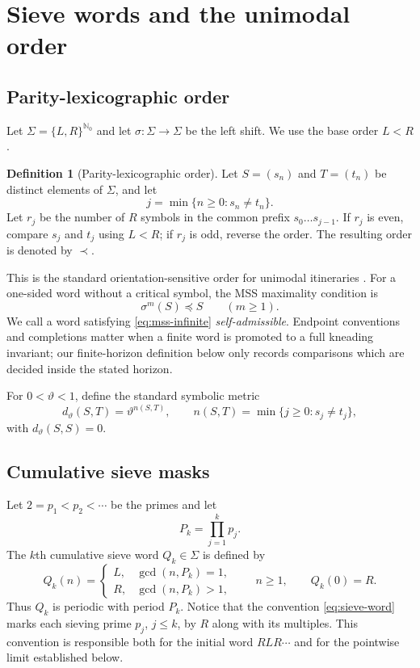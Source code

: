 \documentclass[11pt]{article}
\theoremstyle{definition}
\newtheorem{definition}[theorem]{Definition}
\theoremstyle{remark}
\newcommand{\N}{\mathbb{N}}
\newcommand{\Sig}{\Sigma}
\newcommand{\sh}{\sigma}
\begin{document}
\section{Sieve words and the unimodal order}

\subsection{Parity-lexicographic order}

Let $\Sig=\{L,R\}^{\N_0}$ and let $\sh:\Sig\to\Sig$ be the left shift.  We use the base order $L<R$.

\begin{definition}[Parity-lexicographic order]\label{def:paritylex}
Let $S=(s_n)$ and $T=(t_n)$ be distinct elements of $\Sig$, and let
\[
    j=\min\{n\ge0:s_n\ne t_n\}.
\]
Let $r_j$ be the number of $R$ symbols in the common prefix $s_0\ldots s_{j-1}$.  If $r_j$ is even, compare $s_j$ and $t_j$ using $L<R$; if $r_j$ is odd, reverse the order.  The resulting order is denoted by $\prec$.
\end{definition}

This is the standard orientation-sensitive order for unimodal itineraries \citep{Metropolis1973,MilnorThurston1988}.  For a one-sided word without a critical symbol, the MSS maximality condition is
\begin{equation}\label{eq:mss-infinite}
    \sh^m(S)\preceq S \qquad(m\ge1).
\end{equation}
We call a word satisfying \eqref{eq:mss-infinite} \emph{self-admissible}.  Endpoint conventions and completions matter when a finite word is promoted to a full kneading invariant; our finite-horizon definition below only records comparisons which are decided inside the stated horizon.

For $0<\vartheta<1$, define the standard symbolic metric
\begin{equation}\label{eq:symbolic-metric}
    d_\vartheta(S,T)=\vartheta^{n(S,T)},
    \qquad
    n(S,T)=\min\{j\ge0:s_j\ne t_j\},
\end{equation}
with $d_\vartheta(S,S)=0$.

\subsection{Cumulative sieve masks}

Let $2=p_1<p_2<\cdots$ be the primes and let
\[
    P_k=\prod_{j=1}^k p_j.
\]
The $k$th cumulative sieve word $Q_k\in\Sig$ is defined by
\begin{equation}\label{eq:sieve-word}
    Q_k(n)=
    \begin{cases}
        L,&\gcd(n,P_k)=1,\\
        R,&\gcd(n,P_k)>1,
    \end{cases}
    \qquad n\ge1,
    \qquad Q_k(0)=R.
\end{equation}
Thus $Q_k$ is periodic with period $P_k$.  Notice that the convention \eqref{eq:sieve-word} marks each sieving prime $p_j$, $j\le k$, by $R$ along with its multiples.  This convention is responsible both for the initial word $RLR\cdots$ and for the pointwise limit established below.
\end{document}
